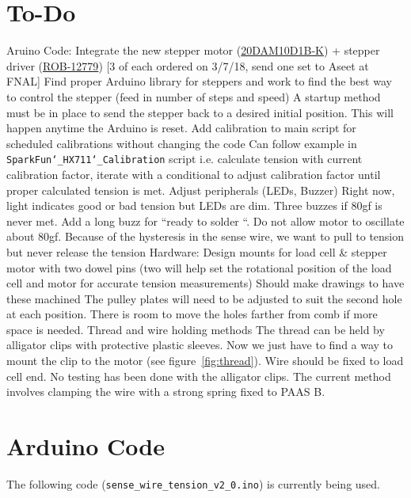 \documentclass[letterpaper,12pt]{article}
\begin{document}
\section*{To-Do}
\begin{outline}
  \1 Aruino Code:
    \2 Integrate the new stepper motor (\href{http://www.portescap.com/products/can-stack-linear-actuators/20dam-k-can-stack-stepper-linear-actuator}{20DAM10D1B-K}) + stepper driver (\href{https://www.digikey.com/product-detail/en/sparkfun-electronics/ROB-12779/1568-1108-ND/5318750?WT.srch=1&gclid=EAIaIQobChMI7vjsvPjX2QIVFiSBCh3bjw2JEAQYASABEgIDnfD_BwE}{ROB-12779}) [3 of each ordered on 3/7/18, send one set to Aseet at FNAL]
      \3 Find proper Arduino library for steppers and work to find the best way to control the stepper (feed in number of steps and speed)
      \3 A startup method must be in place to send the stepper back to a desired initial position. This will happen anytime the Arduino is reset.
    \2 Add calibration to main script for scheduled calibrations without changing the code
      \3 Can follow example in \texttt{SparkFun\char`_HX711\char`_Calibration} script i.e. calculate tension with current calibration factor, iterate with a conditional to adjust calibration factor until proper calculated tension is met.
    \2 Adjust peripherals (LEDs, Buzzer)
      \3 Right now, light indicates good or bad tension but LEDs are dim. Three buzzes if 80gf is never met. Add a long buzz for ``ready to solder ``.
    \2 Do not allow motor to oscillate about 80gf.
      \3 Because of the hysteresis in the sense wire, we want to pull to tension but never release the tension
  \1 Hardware:
    \2 Design mounts for load cell \& stepper motor with two dowel pins (two will help set the rotational position of the load cell and motor for accurate tension measurements)
      \3 Should make drawings to have these machined
      \3 The pulley plates will need to be adjusted to suit the second hole at each position. There is room to move the holes farther from comb if more space is needed.
    \2 Thread and wire holding methods
      \3 The thread can be held by alligator clips with protective plastic sleeves. Now we just have to find a way to mount the clip to the motor (see figure~\ref{fig:thread}).
      \3 Wire should be fixed to load cell end. No testing has been done with the alligator clips. The current method involves clamping the wire with a strong spring fixed to PAAS B. 
\end{outline}


\section{Arduino Code}
The following code ({\tt sense\_wire\_tension\_v2\_0.ino}) is currently being used.

\end{document}
